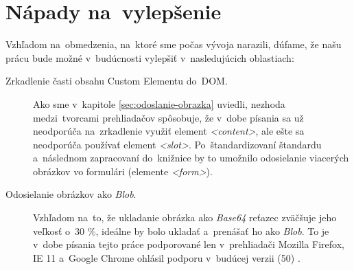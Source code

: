 \section{Nápady na~vylepšenie}

Vzhľadom na~obmedzenia, na~ktoré sme počas vývoja narazili, dúfame, že našu prácu bude možné v~budúcnosti vylepšiť v~nasledujúcich oblastiach:

\begin{description}
	
	\item[Zrkadlenie časti obsahu Custom Elementu do~DOM.] Ako sme v~kapitole \ref{sec:odoslanie-obrazka} uviedli, nezhoda medzi~tvorcami prehliadačov spôsobuje, že v~dobe písania sa už neodporúča na~zrkadlenie využiť element \emph{<content>}, ale ešte sa neodporúča používať element \emph{<slot>}. Po~štandardizovaní štandardu a~následnom zapracovaní do~knižnice by to umožnilo odosielanie viacerých obrázkov vo formulári (elemente \emph{<form>}).
	
	\item[Odosielanie obrázkov ako \emph{Blob}.] Vzhľadom na~to, že ukladanie obrázka ako \emph{Base64} reťazec zväčšuje jeho veľkosť o~30 \%, ideálne by bolo ukladať a~prenášať ho ako \emph{Blob}. To je v~dobe písania tejto práce podporované len v~prehliadači Mozilla Firefox, IE 11 a~Google Chrome ohlásil podporu v~budúcej verzii (50) \cite{Canvas_toBlob}.
	
\end{description}